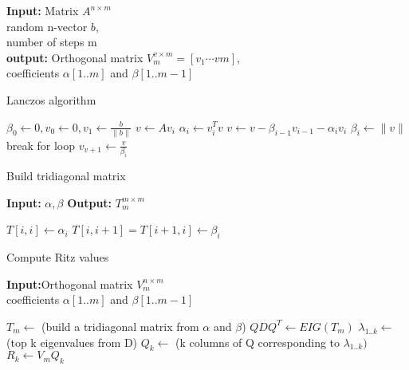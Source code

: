 \begin{algorithm}
{\bf Input:} Matrix $A^{n \times m}$\\
random n-vector $b$,\\
number of steps m\\
{\bf output:} Orthogonal matrix $ V^{v \times m}_{m} = [v_{1}\cdots v{m}]$,\\
coefficients $\alpha[1..m]$ and $\beta[1..m-1]$
\begin{algorithmic}[1]
\caption{Lanczos algorithm}
\STATE $\beta_{0} \leftarrow 0, v_{0} \leftarrow 0, v_{1} \leftarrow \frac{b}{\parallel b \parallel}$ 
	\STATE $v \leftarrow Av_{i}$
	\STATE $\alpha_{i} \leftarrow v^{T}_{i}v $
	\STATE $v \leftarrow v - \beta_{i-1}v_{i-1} - \alpha_{i}v_{i}$
	\STATE $\beta_{i} \leftarrow \parallel v\parallel $
	\STATE break for loop 
	\ENDIF
	\STATE $ v_{v+1} \leftarrow \frac{v}{\beta_{i}} $
\ENDFOR
\end{algorithmic}
\label{eigen:algo1}
\end{algorithm}

\begin{algorithm}
\caption{Build tridiagonal matrix}
{\bf Input:} $\alpha, \beta$
{\bf Output:} $T^{m\times m}_{m}$
\begin{algorithmic}[1]
	\STATE $T[i, i] \leftarrow \alpha_{i} $
	\STATE $T[i, i+1] = T[i+1, i] \leftarrow \beta_{i}$
\ENDFOR	
\end{algorithmic}
\label{eigen:algo2}
\end{algorithm}

\begin{algorithm}
\caption{Compute Ritz values}
{\bf Input:}Orthogonal matrix $V^{n\times m}_{m}$\\
coefficients $\alpha[1..m]$ and $\beta[1..m-1]$
\begin{algorithmic}[1]
\STATE $T_{m} \leftarrow$ (build a tridiagonal matrix from $\alpha$ and $\beta$)
\STATE $QDQ^{T} \leftarrow EIG(T_{m})$
\STATE $\lambda_{1..k} \leftarrow$ (top k eigenvalues from D)
\STATE $Q_{k} \leftarrow $ (k columns of Q corresponding to $\lambda_{1..k})$
\STATE $R_{k} \leftarrow V_{m}Q_{k}$
\end{algorithmic}
\label{eigen:algo3}
\end{algorithm}

